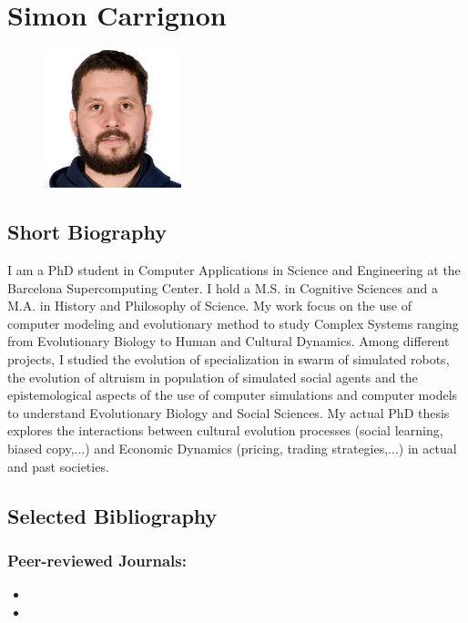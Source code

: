 \documentclass[12pt,a4paper]{article}
\begin{document}
\section*{Simon Carrignon}

\begin{figure}[h]
	\hfill \includegraphics[width=4cm]{scarrign.png}
\end{figure}

\subsection*{Short Biography}
I am a PhD student in Computer Applications in Science and Engineering at the Barcelona Supercomputing Center. I hold a M.S. in Cognitive Sciences and a M.A. in History and Philosophy of Science. My work focus on the use of computer modeling and evolutionary method to study Complex Systems ranging from Evolutionary Biology to Human and Cultural Dynamics. Among different projects, I studied the evolution of specialization in swarm of simulated robots, the evolution of altruism in population of simulated social agents and the epistemological aspects of the use of computer simulations and computer models to understand Evolutionary Biology and Social Sciences. My actual PhD thesis explores the interactions between cultural evolution processes (social learning, biased copy,...) and Economic Dynamics (pricing, trading strategies,...) in actual and past societies.


\subsection*{Selected Bibliography}

\subsubsection*{Peer-reviewed Journals:}

\begin{itemize}
    \item  {}

    \item  {}
\end{itemize}
\end{document}
